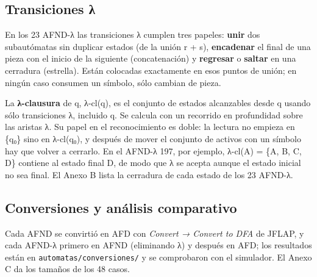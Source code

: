 


\hypertarget{transiciones-ux3bb}{%
\subsection{Transiciones λ}\label{transiciones-ux3bb}}

En los 23 AFND-λ las transiciones λ cumplen tres papeles: \textbf{unir} dos subautómatas sin duplicar estados (de la unión r + s), \textbf{encadenar} el final de una pieza con el inicio de la siguiente (concatenación) y \textbf{regresar} o \textbf{saltar} en una cerradura (estrella). Están colocadas exactamente en esos puntos de unión; en ningún caso consumen un símbolo, sólo cambian de pieza.

La \textbf{λ-clausura} de q, λ-cl(q), es el conjunto de estados alcanzables desde q usando sólo transiciones λ, incluido q. Se calcula con un recorrido en profundidad sobre las aristas λ. Su papel en el reconocimiento es doble: la lectura no empieza en \{q₀\} sino en λ-cl(q₀), y después de mover el conjunto de activos con un símbolo hay que volver a cerrarlo. En el AFND-λ 197, por ejemplo, λ-cl(A) = \{A, B, C, D\} contiene al estado final D, de modo que λ se acepta aunque el estado inicial no sea final. El Anexo B lista la cerradura de cada estado de los 23 AFND-λ.

\hypertarget{conversiones-y-anuxe1lisis-comparativo}{%
\subsection{Conversiones y análisis comparativo}\label{conversiones-y-anuxe1lisis-comparativo}}

Cada AFND se convirtió en AFD con \emph{Convert → Convert to DFA} de JFLAP, y cada AFND-λ primero en AFND (eliminando λ) y después en AFD; los resultados están en \texttt{automatas/conversiones/} y se comprobaron con el simulador. El Anexo C da los tamaños de los 48 casos.

